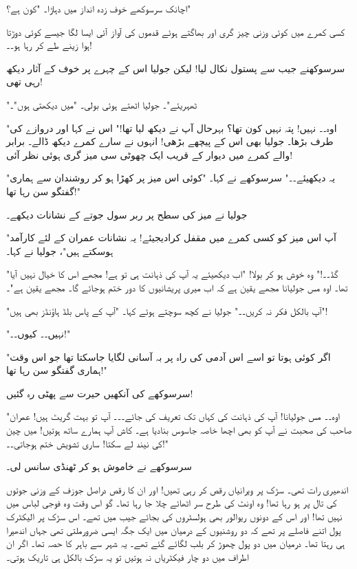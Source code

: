 اچانک سرسوکھے خوف زدہ انداز میں دہاڑا۔ "کون ہے؟"

کسی کمرے میں کوئی وزنی چیز گری اور بھاگتے ہوئے قدموں کی آواز آئی ایسا لگا جیسے کوئی دوڑتا ہوا زینے طے کر رہا ہو۔۔!

سرسوکھنے جیب سے پستول نکال لیا! لیکن جولیا اس کے چہرے پر خوف کے آثار دیکھ رہی تھی!

"ٹھہریئے"۔ جولیا اٹھتے ہوئی بولی۔ "میں دیکھتی ہوں"۔

"اوہ۔۔ نہیں! پتہ نہیں کون تھا؟ بہرحال آپ نے دیکھ لیا تھا!" اس نے کہا اور دروازے کی طرف بڑھا۔ جولیا بھی اس کے پیچھے بڑھی! 
انہوں نے سارے کمرے دیکھ ڈالے۔ برابر والے کمرے میں دیوار کے قریب ایک چھوٹی سی میز گری ہوئی نظر آئی!

"یہ دیکھیئے۔۔" سرسوکھے نے کہا۔ "کوئی اس میز پر کھڑا ہو کر روشندان سے ہماری گفتگو سن رہا تھا!"

جولیا نے میز کی سطح پر ربر سول جوتے کے نشانات دیکھے۔

"آپ اس میز کو کسی کمرے میں مقفل کرادیجیئے! یہ نشانات عمران کے لئے کارآمد ہوسکتے ہیں"، جولیا نے کہا۔

"گڈ۔۔!" وہ خوش ہو کر بولا! "اب دیکھیئے یہ آپ کی ذہانت ہی تو ہے! مجھے اس کا خیال نہیں آیا تھا۔ اوہ مس جولیانا مجھے یقین ہے کہ اب میری پریشانیوں کا دور ختم ہوجائے گا۔ مجھے یقین ہے"۔

"آپ بالکل فکر نہ کریں۔۔" جولیا نے کچھ سوچتے ہوئے کہا۔ "آپ کے پاس بلڈ ہاؤنڈز بھی ہیں"!

"نہیں۔۔ کیوں۔۔!"

"اگر کوئی ہوتا تو اسے اس آدمی کی راہ پر بہ آسانی لگایا جاسکتا تھا جو اس وقت ہماری گفتگو سن رہا تھا!"

سرسوکھے کی آنکھیں حیرت سے پھٹی رہ گئیں!

"اوہ۔۔ مس جولیانا! آپ کی ذہانت کی کہاں تک تعریف کی جائے۔۔۔ آپ تو بہت گریٹ ہیں! عمران صاحب کی صحبت نے آپ کو بھی اچھا خاصہ جاسوس بنادیا ہے۔ کاش آپ ہمارے ساتھ ہوتیں! میں چین کی نیند لے سکتا! ساری تشویش ختم ہوجاتی۔۔!"

سرسوکھے نے خاموش ہو کر ٹھنڈی سانس لی۔

\endR

\bigskip\bigskip\bigskip
\centerline{}
\bigskip\bigskip\bigskip
\beginR
\body

اندھیری رات تھی۔ سڑک پر ویرانیاں رقص کر رہی تھیں! اور ان کا رقص دراصل جوزف کے وزنی جوتوں کی تال پر ہو رہا تھا! وہ اونٹ کی طرح سر اٹھائے چلا جا رہا تھا۔ گو اس وقت وہ فوجی لباس میں نہیں تھا! اور اس کے دونوں ریوالور بھی ہولسٹروں کی بجائے جیب میں تھے۔
اس سڑک پر الیکٹرک پول اتنے فاصلے پر تھے کہ دو روشنیوں کے درمیان میں ایک جگہ ایسی ضرورملتی تھی جہاں اندھیرا ہی رہتا تھا۔ درمیان میں دو پول چھوڑ کر بلب لگائے گئے تھے۔ یہ شہر سے باہر کا حصہ تھا۔ اگر ان اطراف میں دو چار فیکٹریاں نہ ہوتیں تو یہ سڑک بالکل ہی تاریک ہوتی۔

